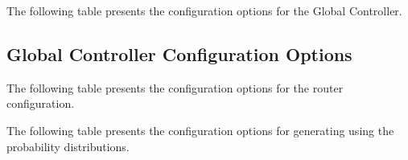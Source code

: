 The following table presents the configuration options for the Global
Controller.

\subsection{Global Controller Configuration Options}


\label{globalcontroller:config}



\noindent The following table presents the configuration options for the router configuration.



\noindent The following table presents the configuration options for
generating using the probability distributions.



